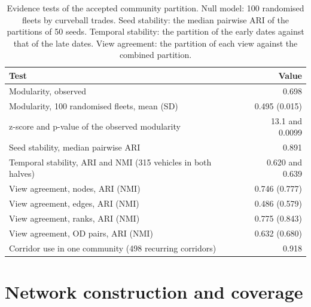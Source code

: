 \begin{table}[htbp]
    \centering
    \footnotesize
    \caption[Evidence tests of the accepted community partition]{Evidence tests of the accepted community partition. Null model: 100 randomised fleets by curveball trades. Seed stability: the median pairwise ARI of the partitions of 50 seeds. Temporal stability: the partition of the early dates against that of the late dates. View agreement: the partition of each view against the combined partition.}
    \label{tab:community_evidence}
    \begin{tabularx}{\linewidth}{@{}Xr@{}}
        \toprule
        \textbf{Test} & \textbf{Value} \\
        \midrule
        Modularity, observed & 0.698 \\
        Modularity, 100 randomised fleets, mean (SD) & 0.495 (0.015) \\
        z-score and p-value of the observed modularity & 13.1 and 0.0099 \\
        Seed stability, median pairwise ARI & 0.891 \\
        Temporal stability, ARI and NMI (315 vehicles in both halves) & 0.620 and 0.639 \\
        View agreement, nodes, ARI (NMI) & 0.746 (0.777) \\
        View agreement, edges, ARI (NMI) & 0.486 (0.579) \\
        View agreement, ranks, ARI (NMI) & 0.775 (0.843) \\
        View agreement, OD pairs, ARI (NMI) & 0.632 (0.680) \\
        Corridor use in one community (498 recurring corridors) & 0.918 \\
        \bottomrule
    \end{tabularx}
\end{table}

\section{Network construction and coverage}
\label{app:network}


